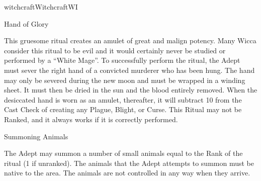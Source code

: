 \begin{College}[1.1]{witchcraft}{Witchcraft}{WI}
\begin{ritual}[R-4]{Hand of Glory}
\begin{effects}
This gruesome ritual creates an amulet of great and malign potency.
Many Wicca consider this ritual to be evil and it would certainly
never be studied or performed by a “White Mage”.  To successfully
perform the ritual, the Adept must sever the right hand of a convicted
murderer who has been hung.  The hand may only be severed during the
new moon and must be wrapped in a winding sheet. It must then be dried
in the sun and the blood entirely removed.  When the desiccated hand
is worn as an amulet, thereafter, it will subtract 10 from the Cast
Check of creating any Plague, Blight, or Curse.  This Ritual may not
be Ranked, and it always works if it is correctly performed.
\end{effects}
\end{ritual}

\begin{ritual}[R-5]{Summoning Animals}

\begin{effects}
The Adept may summon a number of small animals equal to the Rank of
the ritual (1 if unranked).  The animals that the Adept attempts to
summon must be native to the area.  The animals are not controlled in
any way when they arrive.
\end{effects}
\end{ritual}

\end{College}
